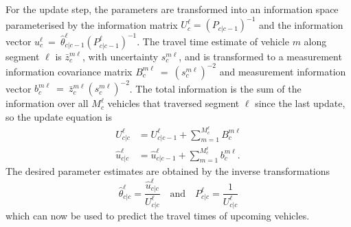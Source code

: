 For the update step, the parameters are transformed into an information
space parameterised by the information matrix $U^\ell_c = (P_{c|c-1})^{-1}$
and the information vector $u^\ell_c~=~\hat \theta^\ell_{c|c-1} (P^\ell_{c|c-1})^{-1}$.
The travel time estimate of vehicle $m$ along segment $\ell$
is $\bar z_c^{m\ell}$, with uncertainty $s^{m\ell}_c$,
and is transformed to a measurement information covariance matrix 
$B_c^{m\ell}~=~(s^{m\ell}_c)^{-2}$
and measurement information vector $b_c^{m\ell}~=~\bar z^{m\ell}_c (s^{m\ell}_c)^{-2}$.
The total information is the sum of the information over all $M_c^\ell$ vehicles
that traversed segment $\ell$ since the last update,
so the update equation is
\begin{align*}
U^\ell_{c|c} &= U^\ell_{c|c-1} + \sum_{m=1}^{M_c^\ell} B^{m\ell}_{c} \\
\hat u^\ell_{c|c} &= \hat u^\ell_{c|c-1} + \sum_{m=1}^{M_c^\ell} b^{m\ell}_{c}.
\end{align*}
The desired parameter estimates are obtained 
by the inverse transformations
\begin{equation*}
\hat \theta^\ell_{c|c} = \frac{\hat u^\ell_{c|c}}{U^\ell_{c|c}} 
\quad\text{and}\quad
P^\ell_{c|c} = \frac{1}{U^\ell_{c|c}}
\end{equation*}
which can now be used to predict the travel times of upcoming vehicles.



